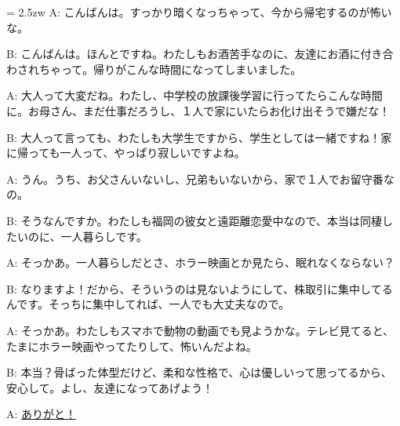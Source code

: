\documentclass[11pt]{amsart}
\title{}
\author{}
\newenvironment{hangall}[1]{\hangindent = 2.5zw\everypar{\hangindent = 2.5zw}}{}
\begin{document}
\maketitle
\begin{hangall}{}%
A: こんばんは。すっかり暗くなっちゃって、今から帰宅するのが怖いな。

B: こんばんは。ほんとですね。わたしもお酒苦手なのに、友達にお酒に付き合わされちゃって。帰りがこんな時間になってしまいました。

A: 大人って大変だね。わたし、中学校の放課後学習に行ってたらこんな時間に。お母さん、まだ仕事だろうし、１人で家にいたらお化け出そうで嫌だな！

B: 大人って言っても、わたしも大学生ですから、学生としては一緒ですね！家に帰っても一人って、やっぱり寂しいですよね。

A: うん。うち、お父さんいないし、兄弟もいないから、家で１人でお留守番なの。

B: そうなんですか。わたしも福岡の彼女と遠距離恋愛中なので、本当は同棲したいのに、一人暮らしです。

A: そっかあ。一人暮らしだとさ、ホラー映画とか見たら、眠れなくならない？

B: なりますよ！だから、そういうのは見ないようにして、株取引に集中してるんです。そっちに集中してれば、一人でも大丈夫なので。

A: そっかあ。わたしもスマホで動物の動画でも見ようかな。テレビ見てると、たまにホラー映画やってたりして、怖いんだよね。

B: 本当？骨ばった体型だけど、柔和な性格で、心は優しいって思ってるから、安心して。よし、友達になってあげよう！

A: \ul{ありがと！}\end{hangall}
\end{document}
